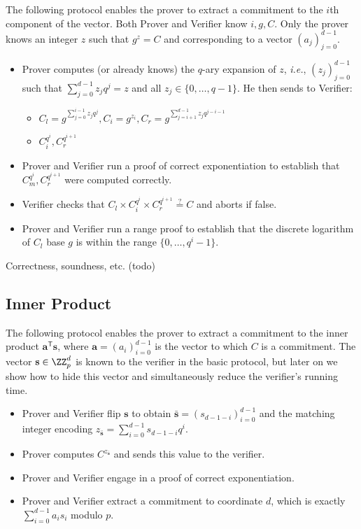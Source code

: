 \documentclass{article}
\theoremstyle{definition}
\begin{document}
The following protocol enables the prover to extract a commitment to the $i$th component of the vector. Both Prover and Verifier know $i, g, C$. Only the prover knows an integer $z$ such that $g^z = C$ and corresponding to a vector $(a_j)_{j=0}^{d-1}$.
\begin{itemize}
\item Prover computes (or already knows) the $q$-ary expansion of $z$, \emph{i.e.}, $(z_j)_{j=0}^{d-1}$ such that $\sum_{j=0}^{d-1} z_j q^j = z$ and all $z_j \in \{0,\ldots, q-1\}$. He then sends to Verifier:
\begin{itemize}
\item $C_l = g^{\sum_{j=0}^{i-1} z_jq^j}, C_i = g^{z_i}, C_r = g^{\sum_{j=i+1}^{d-1} z_j q^{j-i-1}}$
\item $C_i^{q^i}, C_r^{q^{i+1}}$
\end{itemize}
\item Prover and Verifier run a proof of correct exponentiation to establish that $C_m^{q^i}, C_r^{q^{i+1}}$ were computed correctly.
\item Verifier checks that $C_l \times C_i^{q^i} \times C_r^{q^{i+1}} \stackrel{?}{=} C$ and aborts if false.
\item Prover and Verifier run a range proof to establish that the discrete logarithm of $C_l$ base $g$ is within the range $\{0, \ldots, q^i-1\}$.
\end{itemize}

Correctness, soundness, etc. (todo)

\subsection{Inner Product}
\label{section:inner_product}

The following protocol enables the prover to extract a commitment to the inner product $\mathbf{a}^\mathsf{T} \mathbf{s}$, where $\mathbf{a} = (a_i)_{i=0}^{d-1}$ is the vector to which $C$ is a commitment. The vector $\mathbf{s} \in \ZZ_p^d$ is known to the verifier in the basic protocol, but later on we show how to hide this vector and simultaneously reduce the verifier's running time.
\begin{itemize}
\item Prover and Verifier flip $\mathbf{s}$ to obtain $\bar{\mathbf{s}} = (s_{d-1-i})_{i=0}^{d-1}$ and the matching integer encoding $z_{\bar{\mathbf{s}}} = \sum_{i=0}^{d-1} s_{d-1-i} q^i$.
\item Prover computes $C^{z_{\bar{\mathbf{s}}}}$ and sends this value to the verifier.
\item Prover and Verifier engage in a proof of correct exponentiation.
\item Prover and Verifier extract a commitment to coordinate $d$, which is exactly $\sum_{i=0}^{d-1} a_is_i$ modulo $p$.
\end{itemize}
\end{document}
